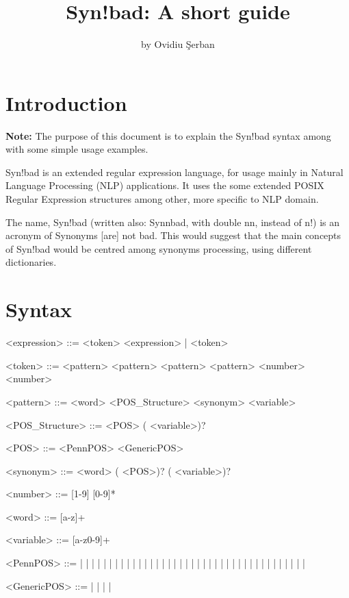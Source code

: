 \documentclass[10pt]{article}
\title{Syn!bad: A short guide}
\author{by Ovidiu \c Serban}
\date{}
\newcommand{\synbad}{Syn!bad }
\begin{document}
	
\maketitle
\vfill
\tableofcontents
\newpage

\section{Introduction}
\textbf{Note: }The purpose of this document is to explain the \synbad syntax among with some simple usage examples. 

\synbad is an extended regular expression language, for usage mainly in Natural Language Processing (NLP) applications. It uses the some extended POSIX Regular Expression structures among other, more specific to NLP domain.

The name, \synbad (written also: Synnbad, with double nn, instead of n!) is an acronym of Synonyms [are] not bad. This would suggest that the main concepts of \synbad would be centred among synonyms processing, using different dictionaries. 

\section{Syntax}

\setlength{\grammarparsep}{20pt plus 1pt minus 1pt}
\setlength{\grammarindent}{12em}

\begin{grammar}

<expression> ::= <token> \lit{ } <expression> | <token>

<token> ::= <pattern> \alt <pattern> \lit{*} \alt <pattern>  \alt <pattern> \lit{\{} <number> \lit{,} <number> \lit{\}}

<pattern> ::= <word> \alt {} <POS\_Structure>  \alt \lit{[} <synonym> \lit{]} \alt \lit{\$} <variable> 

<POS_Structure> ::= <POS> (\lit{\#} <variable>)?

<POS> ::= <PennPOS> \alt <GenericPOS>

<synonym> ::= <word> (\lit{|} <POS>)? (\lit{\#} <variable>)?

<number> ::= [1-9] [0-9]*

<word> ::= [a-z]+

<variable> ::= [a-z0-9]+

<PennPOS> ::= 	 |  |  |  |  |  |  |  
				\alt {} |  |  |  |  |  |  |  
				\alt {} |  |  |  |  |  |  | \lit{\"} 
				\alt \lit{\#} |  |  |  | \lit{\$} |  |  |  | \lit{(} 
				\alt {} | \lit{)} |  | \lit{,} |  |  |  |  |  
				\alt {} | \lit{:} | 

<GenericPOS> ::= \lit{\#*} |  |  |  | 

\end{grammar}
\end{document}

